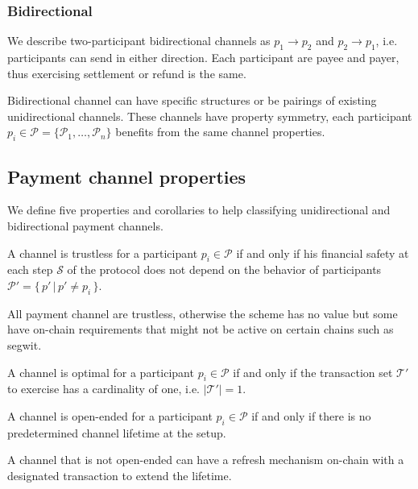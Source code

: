 \documentclass{llncs}
\begin{document}
\subsubsection{Bidirectional}
We describe two-participant bidirectional channels as $p_1 \rightarrow p_2$ and  $p_2 \rightarrow p_1$, i.e. participants can send in either direction. Each participant are payee and payer, thus exercising settlement or refund is the same.

Bidirectional channel can have specific structures or be pairings of existing unidirectional channels. These channels have property symmetry, each participant $p_i \in \mathcal{P} = \{\mathcal{P}_1, \dots, \mathcal{P}_n\}$ benefits from the same channel properties.

\subsection{Payment channel properties}

We define five properties and corollaries to help classifying unidirectional and bidirectional payment channels.

\begin{definition}[Trustless] A channel is trustless for a participant $p_i \in \mathcal{P}$ if and only if his financial safety at each step $\mathcal{S}$ of the protocol does not depend on the behavior of participants $\mathcal{P}' = \{\, p' \, | \, p' \neq p_i \, \}$.
\end{definition}

All payment channel are trustless, otherwise the scheme has no value but some have on-chain requirements that might not be active on certain chains such as \gls{segwit}.

\begin{definition}[Optimal] A channel is optimal for a participant $p_i \in \mathcal{P}$ if and only if the transaction set $\mathcal{T'}$ to exercise has a cardinality of one, i.e. $|\mathcal{T'}| = 1$.
\end{definition}

\begin{definition} A channel is open-ended for a participant $p_i \in \mathcal{P}$ if and only if there is no predetermined channel lifetime at the setup.
\end{definition}

A channel that is not open-ended can have a refresh mechanism on-chain with a designated transaction to extend the lifetime.
\end{document}
